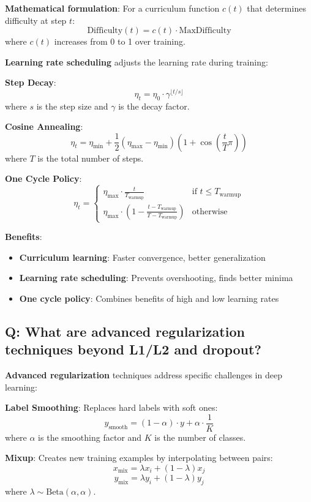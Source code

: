 \textbf{Mathematical formulation}:
For a curriculum function \(c(t)\) that determines difficulty at step \(t\):
\[
\text{Difficulty}(t) = c(t) \cdot \text{MaxDifficulty}
\]
where \(c(t)\) increases from 0 to 1 over training.

\textbf{Learning rate scheduling} adjusts the learning rate during training:

\textbf{Step Decay}:
\[
\eta_t = \eta_0 \cdot \gamma^{\lfloor t/s \rfloor}
\]
where \(s\) is the step size and \(\gamma\) is the decay factor.

\textbf{Cosine Annealing}:
\[
\eta_t = \eta_{\text{min}} + \frac{1}{2}(\eta_{\text{max}} - \eta_{\text{min}})\left(1 + \cos\left(\frac{t}{T}\pi\right)\right)
\]
where \(T\) is the total number of steps.

\textbf{One Cycle Policy}:
\[
\eta_t = \begin{cases}
\eta_{\text{max}} \cdot \frac{t}{T_{\text{warmup}}} & \text{if } t \leq T_{\text{warmup}} \\
\eta_{\text{max}} \cdot \left(1 - \frac{t - T_{\text{warmup}}}{T - T_{\text{warmup}}}\right) & \text{otherwise}
\end{cases}
\]

\textbf{Benefits}:
\begin{itemize}
	\item \textbf{Curriculum learning}: Faster convergence, better generalization
	\item \textbf{Learning rate scheduling}: Prevents overshooting, finds better minima
	\item \textbf{One cycle policy}: Combines benefits of high and low learning rates
\end{itemize}

\subsection*{Q: What are advanced regularization techniques beyond L1/L2 and dropout?}
\textbf{Advanced regularization} techniques address specific challenges in deep learning:

\textbf{Label Smoothing}:
Replaces hard labels with soft ones:
\[
y_{\text{smooth}} = (1 - \alpha) \cdot y + \alpha \cdot \frac{1}{K}
\]
where \(\alpha\) is the smoothing factor and \(K\) is the number of classes.

\textbf{Mixup}:
Creates new training examples by interpolating between pairs:
\[
x_{\text{mix}} = \lambda x_i + (1 - \lambda) x_j
\]
\[
y_{\text{mix}} = \lambda y_i + (1 - \lambda) y_j
\]
where \(\lambda \sim \text{Beta}(\alpha, \alpha)\).

